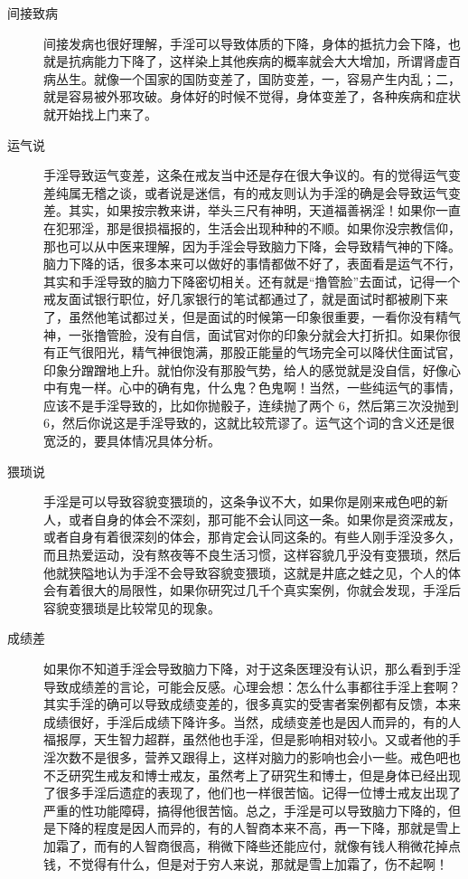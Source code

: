 \begin{description}
    \item[间接致病] 间接发病也很好理解，手淫可以导致体质的下降，身体的抵抗力会下降，也就是抗病能力下降了，这样染上其他疾病的概率就会大大增加，所谓肾虚百病丛生。就像一个国家的国防变差了，国防变差，一，容易产生内乱；二，就是容易被外邪攻破。身体好的时候不觉得，身体变差了，各种疾病和症状就开始找上门来了。
    \item[运气说] 手淫导致运气变差，这条在戒友当中还是存在很大争议的。有的觉得运气变差纯属无稽之谈，或者说是迷信，有的戒友则认为手淫的确是会导致运气变差。其实，如果按宗教来讲，举头三尺有神明，天道福善祸淫！如果你一直在犯邪淫，那是很损福报的，生活会出现种种的不顺。如果你没宗教信仰，那也可以从中医来理解，因为手淫会导致脑力下降，会导致精气神的下降。脑力下降的话，很多本来可以做好的事情都做不好了，表面看是运气不行，其实和手淫导致的脑力下降密切相关。还有就是“撸管脸”去面试，记得一个戒友面试银行职位，好几家银行的笔试都通过了，就是面试时都被刷下来了，虽然他笔试都过关，但是面试的时候第一印象很重要，一看你没有精气神，一张撸管脸，没有自信，面试官对你的印象分就会大打折扣。如果你很有正气很阳光，精气神很饱满，那股正能量的气场完全可以降伏住面试官，印象分蹭蹭地上升。就怕你没有那股气势，给人的感觉就是没自信，好像心中有鬼一样。心中的确有鬼，什么鬼？色鬼啊！当然，一些纯运气的事情，应该不是手淫导致的，比如你抛骰子，连续抛了两个 6，然后第三次没抛到 6，然后你说这是手淫导致的，这就比较荒谬了。运气这个词的含义还是很宽泛的，要具体情况具体分析。
    \item[猥琐说] 手淫是可以导致容貌变猥琐的，这条争议不大，如果你是刚来戒色吧的新人，或者自身的体会不深刻，那可能不会认同这一条。如果你是资深戒友，或者自身有着很深刻的体会，那肯定会认同这条的。有些人刚手淫没多久，而且热爱运动，没有熬夜等不良生活习惯，这样容貌几乎没有变猥琐，然后他就狭隘地认为手淫不会导致容貌变猥琐，这就是井底之蛙之见，个人的体会有着很大的局限性，如果你研究过几千个真实案例，你就会发现，手淫后容貌变猥琐是比较常见的现象。
    \item[成绩差] 如果你不知道手淫会导致脑力下降，对于这条医理没有认识，那么看到手淫导致成绩差的言论，可能会反感。心理会想：怎么什么事都往手淫上套啊？其实手淫的确可以导致成绩变差的，很多真实的受害者案例都有反馈，本来成绩很好，手淫后成绩下降许多。当然，成绩变差也是因人而异的，有的人福报厚，天生智力超群，虽然他也手淫，但是影响相对较小。又或者他的手淫次数不是很多，营养又跟得上，这样对脑力的影响也会小一些。戒色吧也不乏研究生戒友和博士戒友，虽然考上了研究生和博士，但是身体已经出现了很多手淫后遗症的表现了，他们也一样很苦恼。记得一位博士戒友出现了严重的性功能障碍，搞得他很苦恼。总之，手淫是可以导致脑力下降的，但是下降的程度是因人而异的，有的人智商本来不高，再一下降，那就是雪上加霜了，而有的人智商很高，稍微下降些还能应付，就像有钱人稍微花掉点钱，不觉得有什么，但是对于穷人来说，那就是雪上加霜了，伤不起啊！
\end{description}

